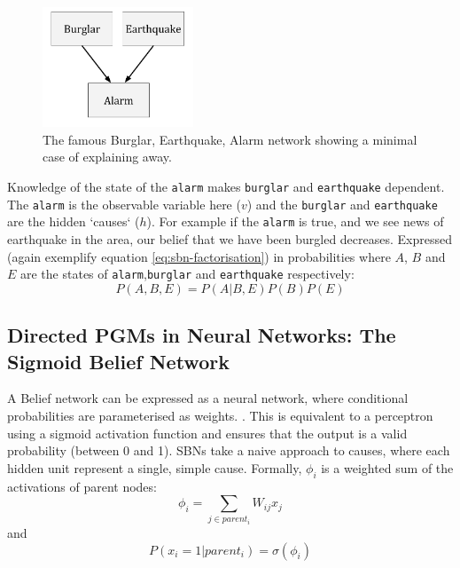 \begin{figure}[h]
\begin{center}
  \includegraphics[width = 0.4\textwidth]{Assets/Explaining_Away.png}
\caption{The famous Burglar, Earthquake, Alarm network showing a minimal case of explaining away.}
\label{F:Explaining-Away}
\end{center}
\end{figure}
Knowledge of the state of the \texttt{alarm} makes \texttt{burglar} and \texttt{earthquake} dependent. The \texttt{alarm} is the observable variable here ($v$) and the \texttt{burglar} and \texttt{earthquake} are the hidden `causes` ($h$). For example if the \texttt{alarm} is true, and we see news of earthquake in the area, our belief that we have been burgled decreases. Expressed (again exemplify equation \ref{eq:sbn-factorisation}) in probabilities where $A$, $B$ and $E$ are the states of \texttt{alarm},\texttt{burglar} and \texttt{earthquake} respectively:
$$
P(A,B,E) = P(A|B,E)P(B)P(E)
$$

\subsection{Directed PGMs in Neural Networks: The Sigmoid Belief Network}

A Belief network can be expressed as a neural network, where conditional probabilities are parameterised as weights. . This is equivalent to a perceptron using a sigmoid activation function and ensures that the output is a valid probability (between 0 and 1).
SBNs take a naive approach to causes, where each hidden unit represent a single, simple cause. Formally, $\phi_i$ is a weighted sum of the activations of parent nodes:
$$ \phi_i = \sum_{j \in parent_i} W_{ij}x_j$$
and
$$
P(x_i = 1 | parent_i) = \sigma(\phi_i)
$$

